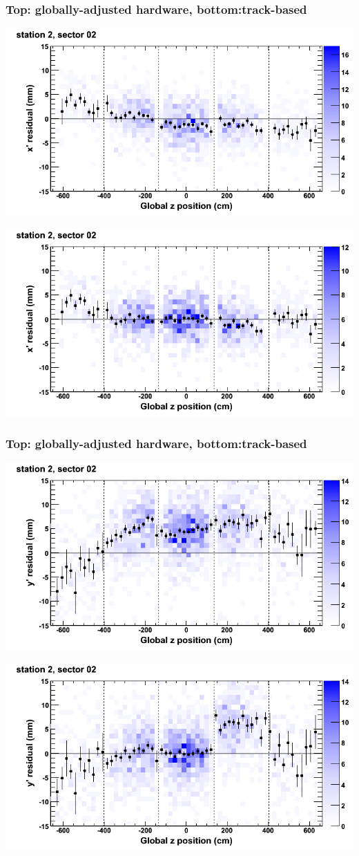\documentclass[compress]{beamer}
\begin{document}
\begin{frame}
\frametitle{Top: globally-adjusted hardware, bottom:track-based}
\includegraphics[width=0.7\linewidth]{NOV4_mapplots_HW/DTvsz_st2sec02_x.png}

\includegraphics[width=0.7\linewidth]{NOV4_mapplots/DTvsz_st2sec02_x.png}
\end{frame}

\begin{frame}
\frametitle{Top: globally-adjusted hardware, bottom:track-based}
\includegraphics[width=0.7\linewidth]{NOV4_mapplots_HW/DTvsz_st2sec02_y.png}

\includegraphics[width=0.7\linewidth]{NOV4_mapplots/DTvsz_st2sec02_y.png}
\end{frame}
\end{document}
